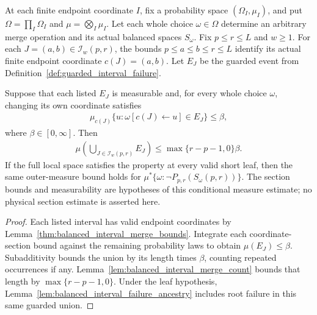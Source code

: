 \begin{lemma}
    \label{thm:balanced_interval_failure_probability}
    \leanok
    At each finite endpoint coordinate $I$, fix a probability space
    $(\Omega_I,\mu_I)$, and put
    $\Omega=\prod_I\Omega_I$ and $\mu=\bigotimes_I\mu_I$.
    Let each whole choice $\omega\in\Omega$ determine an arbitrary
    merge operation and its actual
    balanced spaces $S_\omega$. Fix $p\le r\le L$ and $w\ge1$.
    For each $J=(a,b)\in\mathcal I_w(p,r)$, the bounds
    $p\le a\le b\le r\le L$ identify its actual finite endpoint
    coordinate $c(J)=(a,b)$. Let $E_J$ be the guarded event from
    Definition~\ref{def:guarded_interval_failure}.

    Suppose that each listed $E_J$ is measurable and, for every whole
    choice $\omega$, changing its own coordinate satisfies
    \begin{align}
        \mu_{c(J)}\{u:\omega[c(J)\leftarrow u]\in E_J\}\le\beta,
    \end{align}
    where $\beta\in[0,\infty]$. Then
    \begin{align}
        \mu\left(\bigcup_{J\in\mathcal I_w(p,r)}E_J\right)
        \le \max\{r-p-1,0\}\beta.
    \end{align}
    If the full local space satisfies the property at every valid short
    leaf, then the same outer-measure bound holds for
    $\mu^*\{\omega:\neg P_{p,r}(S_\omega(p,r))\}$.
    The section bounds and measurability are hypotheses of this
    conditional measure estimate; no physical section estimate is
    asserted here.
\end{lemma}
\begin{proof}\leanok
    Each listed interval has valid endpoint coordinates by
    Lemma~\ref{thm:balanced_interval_merge_bounds}.
    Integrate each coordinate-section bound against the remaining
    probability laws to obtain $\mu(E_J)\le\beta$.
    Subadditivity bounds the union by its length times $\beta$,
    counting repeated occurrences if any. Lemma~\ref{lem:balanced_interval_merge_count}
    bounds that length by $\max\{r-p-1,0\}$.
    Under the leaf hypothesis, Lemma~\ref{lem:balanced_interval_failure_ancestry}
    includes root failure in this same guarded union.
\end{proof}

